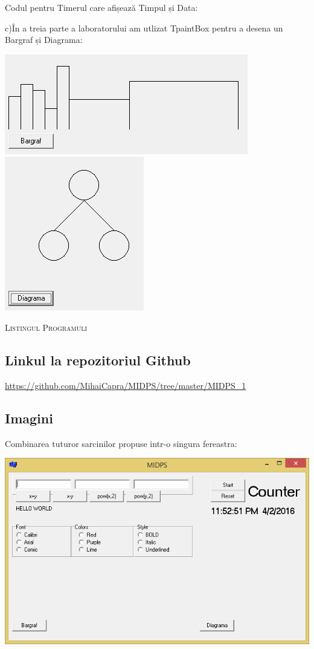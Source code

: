Codul pentru Timerul care afișează Timpul și Data:\\
\begin{center}

\end{center}
c)În a treia parte a laboratorului am utlizat TpaintBox pentru a desena un Bargraf și Diagrama:\\
\begin{center}
\includegraphics[scale=1]{images/C_1}\\
\includegraphics[scale=1]{images/C_2}\\
\end{center}
\textsc{\large Listingul Programuli}\\


\subsection{Linkul la repozitoriul Github}
\begin{center}
\url{https://github.com/MihaiCapra/MIDPS/tree/master/MIDPS_1}
\end{center}

\subsection{Imagini}

Combinarea tuturor sarcinilor propuse intr-o singura fereastra:\\
\begin{center}
\includegraphics[scale=1]{images/main}
\end{center}

\clearpage